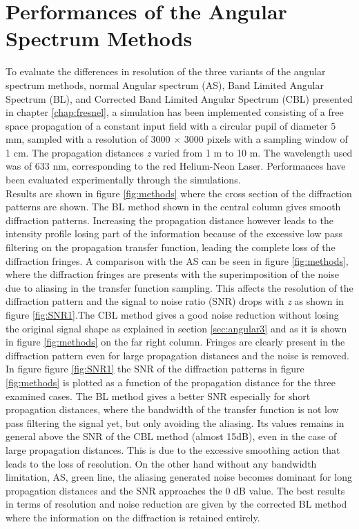 \section{Performances of the Angular Spectrum Methods}
 \label{sec:perfAS}
 To evaluate the differences in resolution of the three variants of the angular spectrum methods, normal Angular spectrum (AS), Band Limited Angular Spectrum (BL), and Corrected Band Limited Angular Spectrum (CBL) presented in chapter \ref{chap:fresnel}, a simulation has been implemented consisting of a free space propagation of a constant input field with a circular pupil of diameter 5 mm, sampled with a resolution of 3000 $\times$ 3000 pixels with a sampling window of 1 cm. The propagation distances \textit{z} varied from 1 m to 10 m. The wavelength used was of 633 nm, corresponding to the red Helium-Neon Laser. Performances have been evaluated experimentally through the simulations.\\ 
 Results are shown in figure \ref{fig:methods} where the cross section of the diffraction patterns are shown. 
 The BL method shown in the central column gives smooth diffraction patterns. Increasing the propagation distance however leads to the intensity profile losing part of the information because of the excessive low pass filtering on the propagation transfer function, leading the complete loss of the diffraction fringes. A comparison with the AS can be seen in figure \ref{fig:methods}, where the diffraction fringes are presents with the superimposition of the noise due to aliasing in the transfer function sampling. This affects the resolution of the diffraction pattern and the signal to noise ratio (SNR) drops with \textit{z} as shown in figure \ref{fig:SNR1}.The CBL method gives a good noise reduction without losing the original signal shape as explained in section \ref{sec:angular3} and as it is shown in figure \ref{fig:methods} on the far right column. Fringes are clearly present in the diffraction pattern even for large propagation distances and the noise is removed. \\
 In figure figure \ref{fig:SNR1} the SNR of the diffraction patterns in figure \ref{fig:methods} is plotted as a function of the propagation distance for the three examined cases. The BL method gives a better SNR especially for short propagation distances, where the bandwidth of the transfer function is not low pass filtering the signal yet, but only avoiding the aliasing. Its values remains in general above the SNR of the CBL method (almost 15dB), even in the case of large propagation distances. This is due to the excessive smoothing action that leads to the loss of resolution. On the other hand without any bandwidth limitation, AS, green line, the aliasing generated noise becomes dominant for long propagation distances and the SNR approaches the 0 dB value. The best results in terms of resolution and noise reduction are given by the corrected BL method where the information on the diffraction is retained entirely.

